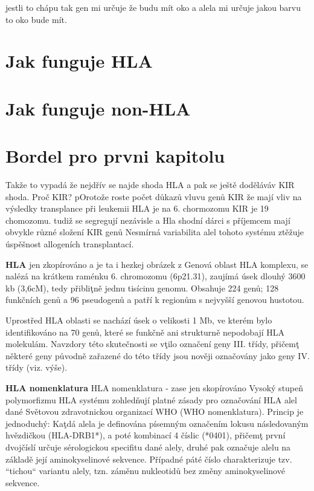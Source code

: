 \documentclass[czech,DP]{thesiskiv}
\begin{document}
jestli to chápu tak gen mi určuje že budu mít oko a alela mi určuje jakou barvu to oko bude mít.


\section{Jak funguje HLA}
\section{Jak funguje non-HLA}

\section{Bordel pro prvni kapitolu}
Takže to vypadá že nejdřív se najde shoda HLA a pak se ještě doděláváv KIR shoda.
Proč KIR? pOrotože roste počet důkazů vluvu genů KIR že mají vliv na výsledky transplance  při leukemii
HLA je na 6. chormozomu KIR je 19 chomozomu. tudiž se segregují nezávisle a Hla shodní dárci s příjemcem mají obvykle různé složení KIR genů
Nesmírná variabilita alel tohoto systému ztěžuje úspěšnost allogeních transplantací. 

\textbf{HLA}
jen zkopírováno a je ta i hezkej obrázek z %
Genová oblast HLA komplexu, se nalézá na krátkem raménku 6. chromozomu (6p21.31), zaujímá úsek dlouhý 3600 kb
(3,6cM), tedy přibliţně jednu tisícinu genomu. Obsahuje 224 genů; 128 funkčních genů
a 96 pseudogenů a patří k regionům s nejvyšší genovou hustotou.

Uprostřed HLA oblasti se nachází úsek o velikosti 1 Mb, ve kterém bylo identifikováno na
70 genů, které se funkčně ani strukturně nepodobají HLA molekulám. Navzdory této
skutečnosti se vţilo označení geny III. třídy, přičemţ některé geny původně zařazené do
této třídy jsou nověji označovány jako geny IV. třídy (viz. výše).

\textbf{HLA nomenklatura}
HLA nomenklatura - zase jen skopírováno
Vysoký stupeň polymorfizmu HLA systému zohledňují platné zásady pro označování HLA
alel dané Světovou zdravotnickou organizací WHO (WHO nomenklatura). Princip je
jednoduchý: Kaţdá alela je definována písemným označením lokusu následovaným
hvězdičkou (HLA-DRB1*), a poté kombinací 4 číslic (*0401), přičemţ první dvojčíslí
určuje sérologickou specifitu dané alely, druhé pak označuje alelu na základě její
aminokyselinové sekvence. Případné páté číslo charakterizuje tzv. “tichou“ variantu alely,
tzn. záměnu nukleotidů bez změny aminokyselinové sekvence.
\end{document}
